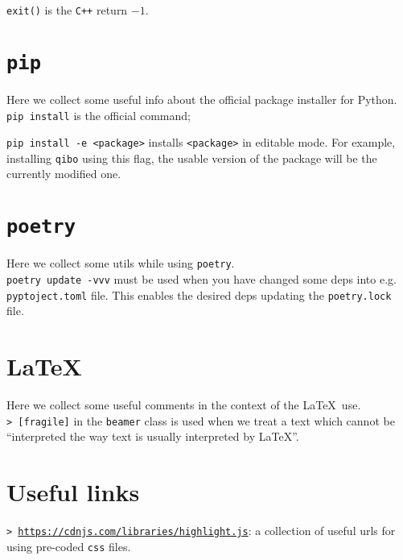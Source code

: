 \documentclass[11pt]{article}
\newcommand{\cmd}[1]{\colorbox{light-gray}{\textcolor{gio}{\texttt{#1}}}}
\begin{document}
\begin{multicols}{2}
\cmd{exit()} is the \texttt{C++} return $-1$.

\section{\texttt{pip}}

Here we collect some useful info about the official  package installer for Python. \\

\cmd{pip install} is the official command;

\cmd{pip install -e <package>} installs \texttt{<package>} in editable mode. 
For example, installing \texttt{qibo} using this flag, the usable version of the 
package will be the currently modified one.

\section{\texttt{poetry}}

Here we collect some utils while using \texttt{poetry}. \\

\cmd{poetry update -vvv} must be used when you have changed some deps into e.g. 
\texttt{pyptoject.toml} file. This enables the desired deps updating the 
\texttt{poetry.lock} file.

\section{\LaTeX}

Here we collect some useful comments in the context of the \LaTeX$\,$ use. \\

\cmd{> [fragile]} in the \texttt{beamer} class is used when we treat a text which 
cannot be ``interpreted the way text is usually interpreted by \LaTeX''.


\newpage

\section*{Useful links}

\cmd{> \href{https://cdnjs.com/libraries/highlight.js}{https://cdnjs.com/libraries/highlight.js}}:
 a collection of useful urls for using pre-coded \texttt{css} files.

\newpage
\end{multicols}
\end{document}
